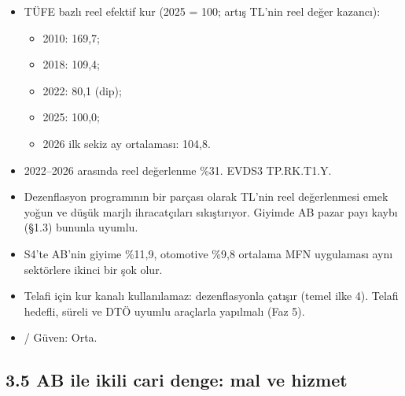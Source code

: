 \begin{itemize}
\tightlist
\item
  TÜFE bazlı reel efektif kur (2025 = 100; artış TL'nin reel değer kazancı):

  \begin{itemize}
  \tightlist
  \item
    2010: 169,7;
  \item
    2018: 109,4;
  \item
    2022: 80,1 (dip);
  \item
    2025: 100,0;
  \item
    2026 ilk sekiz ay ortalaması: 104,8.
  \end{itemize}
\item
  2022--2026 arasında reel değerlenme \%31. \etiketV{} EVDS3 TP.RK.T1.Y.
\item
  Dezenflasyon programının bir parçası olarak TL'nin reel değerlenmesi emek yoğun ve düşük marjlı ihracatçıları sıkıştırıyor. Giyimde AB pazar payı kaybı (§1.3) bununla uyumlu.
\item
  S4'te AB'nin giyime \%11,9, otomotive \%9,8 ortalama MFN uygulaması aynı sektörlere ikinci bir şok olur.
\item
  Telafi için kur kanalı kullanılamaz: dezenflasyonla çatışır (temel ilke 4). Telafi hedefli, süreli ve DTÖ uyumlu araçlarla yapılmalı (Faz 5).
\item
  \etiketV{}/\etiketH{} Güven: Orta.
\end{itemize}

\hypertarget{01_teshis-35-ab-ile-ikili-cari-denge-mal-ve-hizmet}{%
\subsection{3.5 AB ile ikili cari denge: mal ve hizmet}\label{01_teshis-35-ab-ile-ikili-cari-denge-mal-ve-hizmet}}

\begingroup\gbtablo\footnotesize

